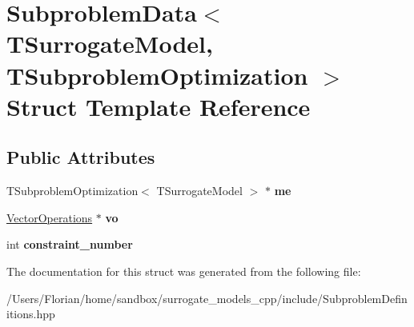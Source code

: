 \hypertarget{struct_subproblem_data}{}\section{Subproblem\+Data$<$ T\+Surrogate\+Model, T\+Subproblem\+Optimization $>$ Struct Template Reference}
\label{struct_subproblem_data}
\subsection*{Public Attributes}
\begin{DoxyCompactItemize}
\item 
T\+Subproblem\+Optimization$<$ T\+Surrogate\+Model $>$ $\ast$ {\bfseries me}\hypertarget{struct_subproblem_data_a0fc95cb78d1006e8a7ce1c1b838aa897}{}\label{struct_subproblem_data_a0fc95cb78d1006e8a7ce1c1b838aa897}

\item 
\hyperlink{class_vector_operations}{Vector\+Operations} $\ast$ {\bfseries vo}\hypertarget{struct_subproblem_data_a0ce3b8f1931f6168506afa4061257c68}{}\label{struct_subproblem_data_a0ce3b8f1931f6168506afa4061257c68}

\item 
int {\bfseries constraint\+\_\+number}\hypertarget{struct_subproblem_data_a8ba5725f47f59c68e0ac93b264b7f34f}{}\label{struct_subproblem_data_a8ba5725f47f59c68e0ac93b264b7f34f}

\end{DoxyCompactItemize}


The documentation for this struct was generated from the following file\+:\begin{DoxyCompactItemize}
\item 
/\+Users/\+Florian/home/sandbox/surrogate\+\_\+models\+\_\+cpp/include/Subproblem\+Definitions.\+hpp\end{DoxyCompactItemize}
